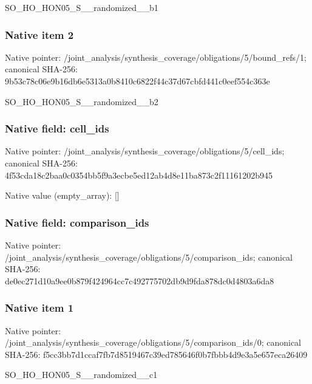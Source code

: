 \documentclass[10pt,a4paper]{article}
\begin{document}
\begingroup\raggedright\sloppy SO\_\allowbreak{}HO\_\allowbreak{}HON05\_\allowbreak{}S\_\allowbreak{}\_\allowbreak{}randomized\_\allowbreak{}\_\allowbreak{}b1\par\endgroup

\subsubsection{Native item 2}
Native pointer: /joint\_\allowbreak{}analysis/synthesis\_\allowbreak{}coverage/obligations/5/bound\_\allowbreak{}refs/1; canonical SHA-256: 9b53c78c06e9b16db6e5313a0b8410c6822f44c37d67cbfd441c0eef554c363e

\begingroup\raggedright\sloppy SO\_\allowbreak{}HO\_\allowbreak{}HON05\_\allowbreak{}S\_\allowbreak{}\_\allowbreak{}randomized\_\allowbreak{}\_\allowbreak{}b2\par\endgroup

\subsubsection{Native field: cell\_\allowbreak{}ids}
Native pointer: /joint\_\allowbreak{}analysis/synthesis\_\allowbreak{}coverage/obligations/5/cell\_\allowbreak{}ids; canonical SHA-256: 4f53cda18c2baa0c0354bb5f9a3ecbe5ed12ab4d8e11ba873c2f11161202b945

Native value (empty\_\allowbreak{}array): []

\subsubsection{Native field: comparison\_\allowbreak{}ids}
Native pointer: /joint\_\allowbreak{}analysis/synthesis\_\allowbreak{}coverage/obligations/5/comparison\_\allowbreak{}ids; canonical SHA-256: de0ec271d10a9ee0b879f424964cc7c492775702db9d9fda878dc0d4803a6da8

\subsubsection{Native item 1}
Native pointer: /joint\_\allowbreak{}analysis/synthesis\_\allowbreak{}coverage/obligations/5/comparison\_\allowbreak{}ids/0; canonical SHA-256: f5cc3bb7d1ccaf7fb7d8519467c39ed785646f0b7fbbb4d9e3a5e657eca26409

\begingroup\raggedright\sloppy SO\_\allowbreak{}HO\_\allowbreak{}HON05\_\allowbreak{}S\_\allowbreak{}\_\allowbreak{}randomized\_\allowbreak{}\_\allowbreak{}c1\par\endgroup
\end{document}
